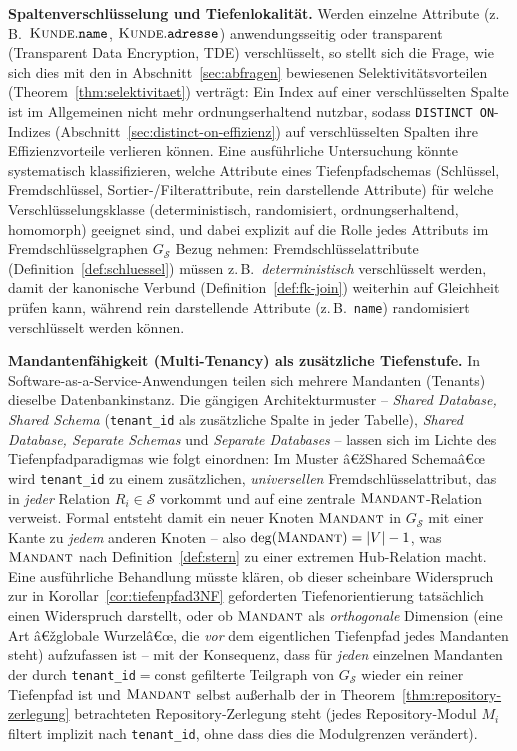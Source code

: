 ﻿\documentclass[a4paper,12pt]{report}
\theoremstyle{definition}
\theoremstyle{remark}
\begin{document}
\textbf{Spaltenverschlüsselung und Tiefenlokalität.} Werden
einzelne Attribute (z.\,B.\ $\textsc{Kunde}.\texttt{name}$,
$\textsc{Kunde}.\texttt{adresse}$) anwendungsseitig oder
transparent (Transparent Data Encryption, TDE) verschlüsselt, so
stellt sich die Frage, wie sich dies mit den in
Abschnitt~\ref{sec:abfragen} bewiesenen Selektivitätsvorteilen
(Theorem~\ref{thm:selektivitaet}) verträgt: Ein Index auf einer
verschlüsselten Spalte ist im Allgemeinen nicht mehr ordnungserhaltend
nutzbar, sodass \texttt{DISTINCT ON}-Indizes
(Abschnitt~\ref{sec:distinct-on-effizienz}) auf verschlüsselten
Spalten ihre Effizienzvorteile verlieren können. Eine ausführliche
Untersuchung könnte systematisch klassifizieren, welche Attribute
eines Tiefenpfadschemas (Schlüssel, Fremdschlüssel,
Sortier-/Filterattribute, rein darstellende Attribute) für welche
Verschlüsselungsklasse (deterministisch, randomisiert,
ordnungserhaltend, homomorph) geeignet sind, und dabei explizit auf
die Rolle jedes Attributs im Fremdschlüsselgraphen $G_{\mathcal{S}}$
Bezug nehmen: Fremdschlüsselattribute (Definition~\ref{def:schluessel})
müssen z.\,B.\ \emph{deterministisch} verschlüsselt werden, damit
der kanonische Verbund (Definition~\ref{def:fk-join}) weiterhin auf
Gleichheit prüfen kann, während rein darstellende Attribute (z.\,B.\
\texttt{name}) randomisiert verschlüsselt werden können.

\textbf{Mandantenfähigkeit (Multi-Tenancy) als zusätzliche
Tiefenstufe.} In Software-as-a-Service-Anwendungen teilen sich
mehrere Mandanten (Tenants) dieselbe Datenbankinstanz. Die gängigen
Architekturmuster -- \emph{Shared Database, Shared Schema}
(\texttt{tenant\_id} als zusätzliche Spalte in jeder Tabelle),
\emph{Shared Database, Separate Schemas} und \emph{Separate
Databases} -- lassen sich im Lichte des Tiefenpfadparadigmas wie
folgt einordnen: Im Muster â€žShared Schemaâ€œ wird \texttt{tenant\_id}
zu einem zusätzlichen, \emph{universellen} Fremdschlüsselattribut, das
in \emph{jeder} Relation $R_i\in\mathcal{S}$ vorkommt und auf eine
zentrale $\textsc{Mandant}$-Relation verweist. Formal entsteht damit
ein neuer Knoten $\textsc{Mandant}$ in $G_{\mathcal{S}}$ mit einer
Kante zu \emph{jedem} anderen Knoten -- also $\deg(\textsc{Mandant})=
|V|-1$, was $\textsc{Mandant}$ nach Definition~\ref{def:stern} zu
einer extremen Hub-Relation macht. Eine ausführliche Behandlung
müsste klären, ob dieser scheinbare Widerspruch zur in
Korollar~\ref{cor:tiefenpfad3NF} geforderten Tiefenorientierung
tatsächlich einen Widerspruch darstellt, oder ob $\textsc{Mandant}$
als \emph{orthogonale} Dimension (eine Art â€žglobale Wurzelâ€œ, die
\emph{vor} dem eigentlichen Tiefenpfad jedes Mandanten steht)
aufzufassen ist -- mit der Konsequenz, dass für \emph{jeden}
einzelnen Mandanten der durch \texttt{tenant\_id}$=$const gefilterte
Teilgraph von $G_{\mathcal{S}}$ wieder ein reiner Tiefenpfad ist und
$\textsc{Mandant}$ selbst außerhalb der in
Theorem~\ref{thm:repository-zerlegung} betrachteten
Repository-Zerlegung steht (jedes Repository-Modul $M_i$ filtert
implizit nach \texttt{tenant\_id}, ohne dass dies die Modulgrenzen
verändert).
\end{document}
